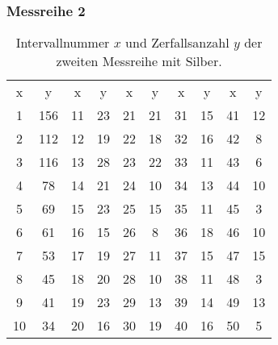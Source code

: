 \subsubsection{Messreihe 2}

\begin{table}[H]
    \centering
    \caption[short]{Intervallnummer $x$ und Zerfallsanzahl $y$ der zweiten Messreihe mit Silber.}
    \label{tab:silber2}
    \begin{tabular}{S S[table-format=3.0] S S S S S S S S}
        \toprule
        {x} & {y} & {x} & {y} & {x} & {y} & {x} & {y} & {x} & {y} \\
        \cmidrule(lr){1-2} \cmidrule(lr){3-4} \cmidrule(lr){5-6} \cmidrule(lr){7-8} \cmidrule(lr){9-10}
        1 & 156 & 11 & 23 & 21 & 21 & 31 & 15 & 41 & 12 \\
        2 & 112 & 12 & 19 & 22 & 18 & 32 & 16 & 42 &  8 \\
        3 & 116 & 13 & 28 & 23 & 22 & 33 & 11 & 43 &  6 \\
        4 &  78 & 14 & 21 & 24 & 10 & 34 & 13 & 44 & 10 \\
        5 &  69 & 15 & 23 & 25 & 15 & 35 & 11 & 45 &  3 \\
        6 &  61 & 16 & 15 & 26 &  8 & 36 & 18 & 46 & 10 \\
        7 &  53 & 17 & 19 & 27 & 11 & 37 & 15 & 47 & 15 \\
        8 &  45 & 18 & 20 & 28 & 10 & 38 & 11 & 48 &  3 \\
        9 &  41 & 19 & 23 & 29 & 13 & 39 & 14 & 49 & 13 \\
       10 &  34 & 20 & 16 & 30 & 19 & 40 & 16 & 50 &  5 \\
        \bottomrule
    \end{tabular}
\end{table}

